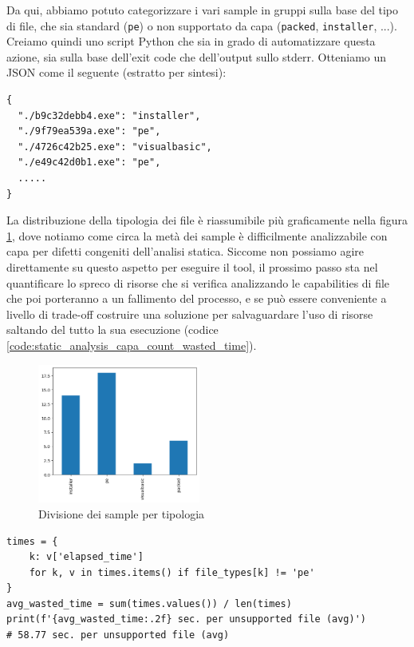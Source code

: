 \medskip

Da qui, abbiamo potuto categorizzare i vari sample in gruppi sulla base del tipo di file, che sia standard (\texttt{pe}) o non supportato da capa (\texttt{packed}, \texttt{installer}, ...).
Creiamo quindi uno script Python che sia in grado di automatizzare questa azione, sia sulla base dell'exit code che dell'output sullo stderr. Otteniamo un JSON come il seguente (estratto per sintesi):

\begin{verbatim}
{
  "./b9c32debb4.exe": "installer",
  "./9f79ea539a.exe": "pe",
  "./4726c42b25.exe": "visualbasic",
  "./e49c42d0b1.exe": "pe",
  .....
}
\end{verbatim}

La distribuzione della tipologia dei file è riassumibile più graficamente nella figura \ref{fig:capa_file_type_split}, dove notiamo come circa la metà dei sample è difficilmente analizzabile con capa per difetti congeniti dell'analisi statica.
Siccome non possiamo agire direttamente su questo aspetto per eseguire il tool, il prossimo passo sta nel quantificare lo spreco di risorse che si verifica analizzando le capabilities di file che poi porteranno a un fallimento del processo, e se può essere conveniente a livello di trade-off costruire una soluzione per salvaguardare l'uso di risorse saltando del tutto la sua esecuzione (codice \ref{code:static_analysis_capa_count_wasted_time}).

\begin{figure}[!htb]
    \centering
    \includegraphics[height=1.8in]{assets/capa_file_type_split.png}
    \caption{Divisione dei sample per tipologia}
    \label{fig:capa_file_type_split}
\end{figure}

\begin{code}
\begin{verbatim}
times = {
    k: v['elapsed_time']
    for k, v in times.items() if file_types[k] != 'pe'
}
avg_wasted_time = sum(times.values()) / len(times)
print(f'{avg_wasted_time:.2f} sec. per unsupported file (avg)')
# 58.77 sec. per unsupported file (avg)
\end{verbatim}
\caption{Calcolo del tempo sprecato eseguendo capa su file non supportati}
\label{code:static_analysis_capa_count_wasted_time}
\end{code}

